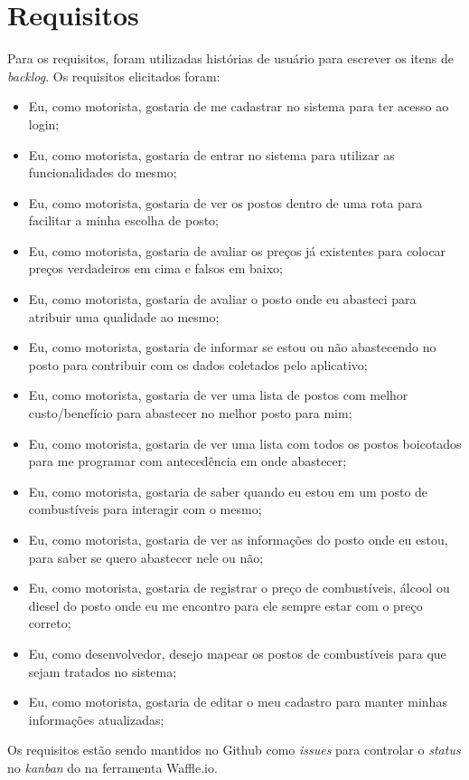 \section{Requisitos}

Para os requisitos, foram utilizadas histórias de usuário para escrever os itens de \textit{backlog}. Os requisitos elicitados foram:
\begin{itemize}
    \item Eu, como motorista, gostaria de me cadastrar no sistema para ter acesso ao login;
    \item Eu, como motorista, gostaria de entrar no sistema para utilizar as funcionalidades do mesmo;
    \item Eu, como motorista, gostaria de ver os postos dentro de uma rota para facilitar a minha escolha de posto;
    \item Eu, como motorista, gostaria de avaliar os preços já existentes para colocar preços verdadeiros em cima e falsos em baixo;
    \item Eu, como motorista, gostaria de avaliar o posto onde eu abasteci para atribuir uma qualidade ao mesmo;
    \item Eu, como motorista, gostaria de informar se estou ou não abastecendo no posto para contribuir com os dados coletados pelo aplicativo;
    \item Eu, como motorista, gostaria de ver uma lista de postos com melhor custo/benefício para abastecer no melhor posto para mim;
    \item Eu, como motorista, gostaria de ver uma lista com todos os postos boicotados para me programar com antecedência em onde abastecer;
    \item Eu, como motorista, gostaria de saber quando eu estou em um posto de combustíveis para interagir com o mesmo;
    \item Eu, como motorista, gostaria de ver as informações do posto onde eu estou, para saber se quero abastecer nele ou não;
    \item Eu, como motorista, gostaria de registrar o preço de combustíveis, álcool ou diesel do posto onde eu me encontro para ele sempre estar com o preço correto;
    \item Eu, como desenvolvedor, desejo mapear os postos de combustíveis para que sejam tratados no sistema;
    \item Eu, como motorista, gostaria de editar o meu cadastro para manter minhas informações atualizadas;
\end{itemize}
Os requisitos estão sendo mantidos no Github como \textit{issues} para controlar o \textit{status} no \textit{kanban} do  na ferramenta Waffle.io.
